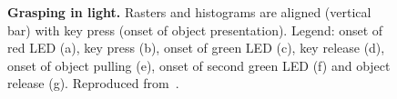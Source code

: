 \begin{figure}[htbp]
	\centering

	\caption[Canonical neuron: grasping in light]{\textbf{Grasping in light.}
    Rasters and histograms are aligned (vertical bar) with key press (onset
	of object presentation). 
	Legend: onset of red LED (a), key press (b), onset of green LED (c), key release
	(d), onset of object pulling (e), onset of second green LED (f) and 
	object release (g).
	Reproduced from~\citet{murata.etal:1997}.}	
	\label{fig:actions:F5:murata:a:1}
\end{figure}
